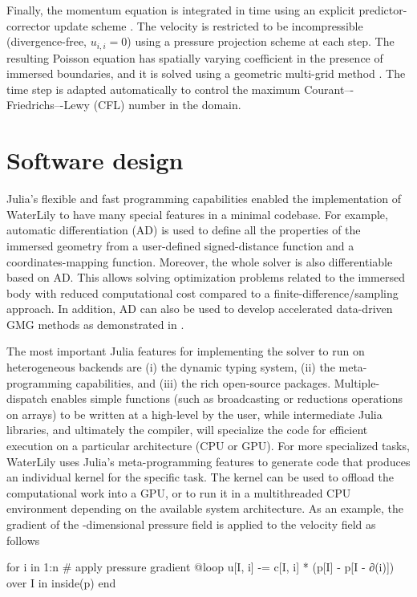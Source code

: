 \documentclass[10pt,a4paper]{article}
\begin{document}
Finally, the momentum equation is integrated in time using an explicit predictor-corrector update scheme \citep{Lauber2022}. The velocity is restricted to be incompressible (divergence-free, $u_{i,i}=0$) using a pressure projection scheme at each step. The resulting Poisson equation has spatially varying coefficient in the presence of immersed boundaries, and it is solved using a geometric multi-grid method \citep{Weymouth2022}. The time step is adapted automatically to control the maximum Courant–-Friedrichs–-Lewy (CFL) number in the domain.

\section{Software design}\label{sec:software_design}

Julia’s flexible and fast programming capabilities enabled the implementation of WaterLily to have many special features in a minimal codebase. For example, automatic differentiation (AD) is used to define all the properties of the immersed geometry from a user-defined signed-distance function and a coordinates-mapping function. Moreover, the whole solver is also differentiable based on AD. This allows solving optimization problems related to the immersed body with reduced computational cost compared to a finite-difference/sampling approach. In addition, AD can also be used to develop accelerated data-driven GMG methods as demonstrated in \cite{Weymouth2022}.

The most important Julia features for implementing the solver to run on heterogeneous backends are (i) the dynamic typing system, (ii) the meta-programming capabilities, and (iii) the rich open-source packages. Multiple-dispatch enables simple functions (such as broadcasting or reductions operations on arrays) to be written at a high-level by the user, while intermediate Julia libraries, and ultimately the compiler, will specialize the code for efficient execution on a particular architecture (CPU or GPU). For more specialized tasks, WaterLily uses Julia's meta-programming features to generate code that produces an individual kernel for the specific task. The kernel can be used to offload the computational work into a GPU, or to run it in a multithreaded CPU environment depending on the available system architecture. As an example, the gradient of the -dimensional pressure field  is applied to the velocity field  as follows

\begin{minipage}{\linewidth}
\begin{jllisting}
for i in 1:n  # apply pressure gradient
    @loop u[I, i] -= c[I, i] * (p[I] - p[I - ∂(i)]) over I in inside(p)
end
\end{jllisting}
\end{minipage}
\end{document}
